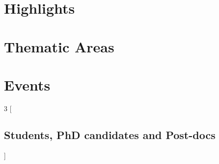 \documentclass[11pt,fleqn]{book} %
\begin{document}
\chapter{Highlights}
\newpage







\chapter{Thematic Areas}
\newpage




\chapter{Events}
\newpage


\newpage
\begin{multicols}{3}
[
    \section*{Students, PhD candidates and Post-docs}
]
\end{multicols}


\end{document}
